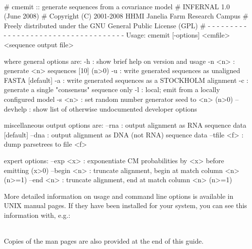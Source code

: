 \\

\begin{sreoutput}
# cmemit :: generate sequences from a covariance model
# INFERNAL 1.0 (June 2008)
# Copyright (C) 2001-2008 HHMI Janelia Farm Research Campus
# Freely distributed under the GNU General Public License (GPL)
# - - - - - - - - - - - - - - - - - - - - - - - - - - - - - - - - - - - -
Usage: cmemit [-options] <cmfile> <sequence output file>

where general options are:
  -h        : show brief help on version and usage
  -n <n>    : generate <n> sequences  [10]  (n>0)
  -u        : write generated sequences as unaligned FASTA  [default]
  -a        : write generated sequences as a STOCKHOLM alignment
  -c        : generate a single "consensus" sequence only
  -l        : local; emit from a locally configured model
  -s <n>    : set random number generator seed to <n>  (n>0)
  --devhelp : show list of otherwise undocumented developer options

miscellaneous output options are:
  --rna       : output alignment as RNA sequence data  [default]
  --dna       : output alignment as DNA (not RNA) sequence data
  --tfile <f> : dump parsetrees to file <f>

expert options:
  --exp <x>   : exponentiate CM probabilities by <x> before emitting  (x>0)
  --begin <n> : truncate alignment, begin at match column <n>  (n>=1)
  --end <n>   : truncate alignment,   end at match column <n>  (n>=1)
\end{sreoutput}

More detailed information on usage and command line options is
available in UNIX manual pages. If they have been installed for your
system, you can see this information with, e.g.:

\\

Copies of the man pages are also provided at the end of this guide.


